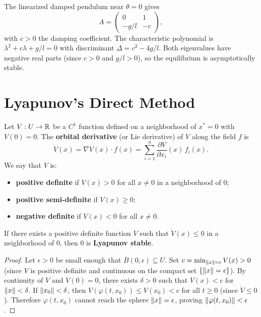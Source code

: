 \begin{example}
The linearized damped pendulum near $\theta = 0$ gives
\[
    A = \begin{pmatrix} 0 & 1 \\ -g/l & -c \end{pmatrix},
\]
with $c > 0$ the damping coefficient. The characteristic polynomial is
$\lambda^2 + c\lambda + g/l = 0$ with discriminant $\Delta = c^2 - 4g/l$.
Both eigenvalues have negative real parts (since $c > 0$ and $g/l > 0$),
so the equilibrium is asymptotically stable.
\end{example}

\section{Lyapunov's Direct Method}

\begin{definition}
Let $V : U \to \mathbb{R}$ be a $C^1$ function defined on a neighborhood of
$x^* = 0$ with $V(0) = 0$. The \textbf{orbital derivative} (or Lie
derivative) of $V$ along the field $f$ is
\[
    \dot{V}(x) = \nabla V(x) \cdot f(x) = \sum_{i=1}^n \frac{\partial V}{\partial x_i}(x)\, f_i(x).
\]
We say that $V$ is:
\begin{itemize}
    \item \textbf{positive definite} if $V(x) > 0$ for all $x \neq 0$ in a
    neighborhood of $0$;
    \item \textbf{positive semi-definite} if $V(x) \geq 0$;
    \item \textbf{negative definite} if $V(x) < 0$ for all $x \neq 0$.
\end{itemize}
\end{definition}

\begin{theorem}
\label{thm:lyap-stable}
If there exists a positive definite function $V$ such that $\dot{V}(x) \leq 0$
in a neighborhood of $0$, then $0$ is \textbf{Lyapunov stable}.
\end{theorem}

\begin{proof}
Let $\epsilon > 0$ be small enough that $\overline{B}(0, \epsilon) \subseteq U$.
Set $c = \min_{\left\| x \right\| = \epsilon} V(x) > 0$ (since $V$ is positive definite
and continuous on the compact set $\{\left\| x \right\| = \epsilon\}$). By continuity
of $V$ and $V(0) = 0$, there exists $\delta > 0$ such that $V(x) < c$ for
$\left\| x \right\| < \delta$. If $\left\| x_0 \right\| < \delta$, then
$V(\varphi(t, x_0)) \leq V(x_0) < c$ for all $t \geq 0$ (since
$\dot{V} \leq 0$). Therefore $\varphi(t, x_0)$ cannot reach the sphere
$\left\| x \right\| = \epsilon$, proving $\left\| \varphi(t, x_0) \right\| < \epsilon$.
\end{proof}

